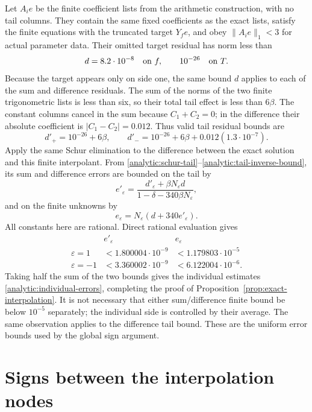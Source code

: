 \documentclass[11pt]{article}
\theoremstyle{remark}\newtheorem{remark}[theorem]{Remark}
\begin{document}
Let $A_i e$ be the finite coefficient lists from the arithmetic
construction, with no tail columns. They contain the same fixed
coefficients as the exact lists, satisfy the finite equations with the
truncated target $Y_f e$, and obey $\|A_i e\|_1<3$ for actual parameter
data. Their omitted target residual has norm less than
\[
 d=8.2\cdot10^{-8}\quad\hbox{on }f,
 \qquad 10^{-26}\quad\hbox{on }T.
\]
Because the target appears only on side one, the same bound $d$ applies
to each of the sum and difference residuals. The sum of the norms of
the two finite trigonometric lists is less than six, so their total
tail effect is less than $6\beta$. The constant columns cancel in the
sum because $C_1+C_2=0$; in the difference their absolute coefficient
is $|C_1-C_2|=0.012$. Thus valid tail residual bounds are
\[
 d'_+=10^{-26}+6\beta,
 \qquad
 d'_-=10^{-26}+6\beta+0.012(1.3\cdot10^{-7}).
\]
Apply the same Schur elimination to the difference between the exact
solution and this finite interpolant. From
\eqref{analytic:schur-tail}--\eqref{analytic:tail-inverse-bound}, its
sum and difference errors are bounded on the tail by
\begin{equation}
 e'_\varepsilon=
 \frac{d'_\varepsilon+\beta N_\varepsilon d}
      {1-\delta-340\beta N_\varepsilon},
 \label{analytic:tail-error}
\end{equation}
and on the finite unknowns by
\begin{equation}
 e_\varepsilon=N_\varepsilon(d+340e'_\varepsilon).
 \label{analytic:finite-error}
\end{equation}
All constants here are rational. Direct rational evaluation gives
\[
\begin{array}{c|cc}
 & e'_\varepsilon & e_\varepsilon\\\hline
 \varepsilon=1 & <1.800004\cdot10^{-9} & <1.179803\cdot10^{-5}\\
 \varepsilon=-1 & <3.360002\cdot10^{-9} & <6.122004\cdot10^{-6}.
\end{array}
\]
Taking half the sum of the two bounds gives the individual estimates
\eqref{analytic:individual-errors}, completing the proof of
Proposition~\ref{prop:exact-interpolation}.
It is not necessary that either sum/difference finite bound be below
$10^{-5}$ separately; the individual side is controlled by their average.
The same observation applies to the difference tail bound.
These are the uniform error bounds used by the global sign argument.

\section{Signs between the interpolation nodes}
\label{sec:global-signs}
\end{document}
